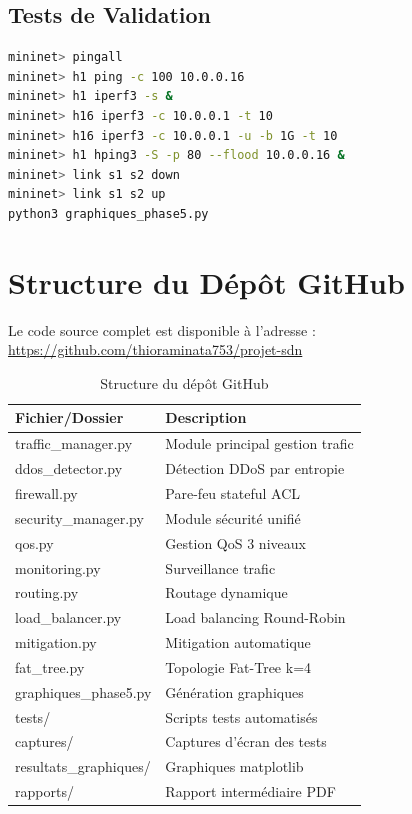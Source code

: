 \documentclass[12pt,a4paper]{report}
\begin{document}
\section{Tests de Validation}

\begin{lstlisting}[language=bash,
caption=Commandes de test dans Mininet]
mininet> pingall
mininet> h1 ping -c 100 10.0.0.16
mininet> h1 iperf3 -s &
mininet> h16 iperf3 -c 10.0.0.1 -t 10
mininet> h16 iperf3 -c 10.0.0.1 -u -b 1G -t 10
mininet> h1 hping3 -S -p 80 --flood 10.0.0.16 &
mininet> link s1 s2 down
mininet> link s1 s2 up
python3 graphiques_phase5.py
\end{lstlisting}

\chapter{Structure du Dépôt GitHub}

Le code source complet est disponible à l'adresse :
\url{https://github.com/thioraminata753/projet-sdn}

\begin{table}[H]
\centering
\caption{Structure du dépôt GitHub}
\label{tab:github}
\begin{tabular}{ll}
\toprule
\textbf{Fichier/Dossier} & \textbf{Description} \\
\midrule
traffic\_manager.py & Module principal gestion trafic \\
ddos\_detector.py & Détection DDoS par entropie \\
firewall.py & Pare-feu stateful ACL \\
security\_manager.py & Module sécurité unifié \\
qos.py & Gestion QoS 3 niveaux \\
monitoring.py & Surveillance trafic \\
routing.py & Routage dynamique \\
load\_balancer.py & Load balancing Round-Robin \\
mitigation.py & Mitigation automatique \\
fat\_tree.py & Topologie Fat-Tree k=4 \\
graphiques\_phase5.py & Génération graphiques \\
tests/ & Scripts tests automatisés \\
captures/ & Captures d'écran des tests \\
resultats\_graphiques/ & Graphiques matplotlib \\
rapports/ & Rapport intermédiaire PDF \\
\bottomrule
\end{tabular}
\end{table}
\end{document}

